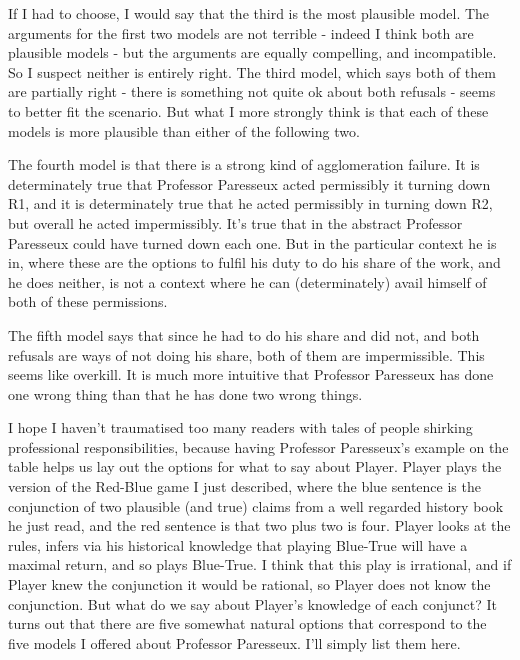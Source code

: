 \documentclass[
  11pt,
]{book}
\begin{document}
If I had to choose, I would say that the third is the most plausible model. The arguments for the first two models are not terrible - indeed I think both are plausible models - but the arguments are equally compelling, and incompatible. So I suspect neither is entirely right. The third model, which says both of them are partially right - there is something not quite ok about both refusals - seems to better fit the scenario. But what I more strongly think is that each of these models is more plausible than either of the following two.

The fourth model is that there is a strong kind of agglomeration failure. It is determinately true that Professor Paresseux acted permissibly it turning down R1, and it is determinately true that he acted permissibly in turning down R2, but overall he acted impermissibly. It's true that in the abstract Professor Paresseux could have turned down each one. But in the particular context he is in, where these are the options to fulfil his duty to do his share of the work, and he does neither, is not a context where he can (determinately) avail himself of both of these permissions.

The fifth model says that since he had to do his share and did not, and both refusals are ways of not doing his share, both of them are impermissible. This seems like overkill. It is much more intuitive that Professor Paresseux has done one wrong thing than that he has done two wrong things.

I hope I haven't traumatised too many readers with tales of people shirking professional responsibilities, because having Professor Paresseux's example on the table helps us lay out the options for what to say about Player. Player plays the version of the Red-Blue game I just described, where the blue sentence is the conjunction of two plausible (and true) claims from a well regarded history book he just read, and the red sentence is that two plus two is four. Player looks at the rules, infers via his historical knowledge that playing Blue-True will have a maximal return, and so plays Blue-True. I think that this play is irrational, and if Player knew the conjunction it would be rational, so Player does not know the conjunction. But what do we say about Player's knowledge of each conjunct? It turns out that there are five somewhat natural options that correspond to the five models I offered about Professor Paresseux. I'll simply list them here.
\end{document}
